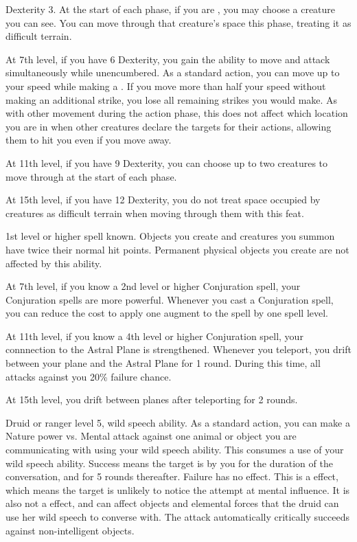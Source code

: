     \featpres Dexterity 3.
    \featben At the start of each phase, if you are , you may choose a creature you can see.
    You can move through that creature's space this phase, treating it as difficult terrain.

    At 7th level, if you have 6 Dexterity, you gain the ability to move and attack simultaneously while unencumbered.
    As a standard action, you can move up to your speed while making a .
    If you move more than half your speed without making an additional strike, you lose all remaining strikes you would make.
    As with other movement during the action phase, this does not affect which location you are in when other creatures declare the targets for their actions, allowing them to hit you even if you move away.

    At 11th level, if you have 9 Dexterity, you can choose up to two creatures to move through at the start of each phase.

    At 15th level, if you have 12 Dexterity, you do not treat space occupied by creatures as difficult terrain when moving through them with this feat.

    \featpres 1st level or higher  spell known.
    \featben Objects you create and creatures you summon have twice their normal hit points.
    Permanent physical objects you create are not affected by this ability.

    At 7th level, if you know a 2nd level or higher Conjuration spell, your Conjuration spells are more powerful.
    Whenever you cast a Conjuration spell, you can reduce the cost to apply one augment to the spell by one spell level.

    At 11th level, if you know a 4th level or higher Conjuration spell, your connnection to the Astral Plane is strengthened.
    Whenever you teleport, you drift between your plane and the Astral Plane for 1 round.
    During this time, all attacks against you 20\% failure chance.

    At 15th level, you drift between planes after teleporting for 2 rounds.

    \featpres Druid or ranger level 5, wild speech ability.
    \featben  As a standard action, you can make a Nature power vs. Mental attack against one animal or object you are communicating with using your wild speech ability.
    This consumes a use of your wild speech ability.
    Success means the target is \charmed by you for the duration of the conversation, and for 5 rounds thereafter.
    Failure has no effect.
    This is a  effect, which means the target is unlikely to notice the attempt at mental influence.
    It is also not a  effect, and can affect objects and elemental forces that the druid can use her wild speech to converse with.
    The attack automatically critically succeeds against non-intelligent objects.


